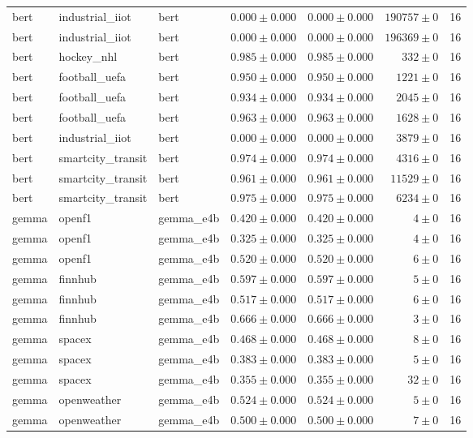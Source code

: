 \begin{table}[htbp]
\begin{tabular}{l l l r r r r}
bert & industrial\_iiot & bert & $0.000\pm0.000$ & $0.000\pm0.000$ & $190757\pm0$ & 16 \\
bert & industrial\_iiot & bert & $0.000\pm0.000$ & $0.000\pm0.000$ & $196369\pm0$ & 16 \\
bert & hockey\_nhl & bert & $0.985\pm0.000$ & $0.985\pm0.000$ & $332\pm0$ & 16 \\
bert & football\_uefa & bert & $0.950\pm0.000$ & $0.950\pm0.000$ & $1221\pm0$ & 16 \\
bert & football\_uefa & bert & $0.934\pm0.000$ & $0.934\pm0.000$ & $2045\pm0$ & 16 \\
bert & football\_uefa & bert & $0.963\pm0.000$ & $0.963\pm0.000$ & $1628\pm0$ & 16 \\
bert & industrial\_iiot & bert & $0.000\pm0.000$ & $0.000\pm0.000$ & $3879\pm0$ & 16 \\
bert & smartcity\_transit & bert & $0.974\pm0.000$ & $0.974\pm0.000$ & $4316\pm0$ & 16 \\
bert & smartcity\_transit & bert & $0.961\pm0.000$ & $0.961\pm0.000$ & $11529\pm0$ & 16 \\
bert & smartcity\_transit & bert & $0.975\pm0.000$ & $0.975\pm0.000$ & $6234\pm0$ & 16 \\
gemma & openf1 & gemma\_e4b & $0.420\pm0.000$ & $0.420\pm0.000$ & $4\pm0$ & 16 \\
gemma & openf1 & gemma\_e4b & $0.325\pm0.000$ & $0.325\pm0.000$ & $4\pm0$ & 16 \\
gemma & openf1 & gemma\_e4b & $0.520\pm0.000$ & $0.520\pm0.000$ & $6\pm0$ & 16 \\
gemma & finnhub & gemma\_e4b & $0.597\pm0.000$ & $0.597\pm0.000$ & $5\pm0$ & 16 \\
gemma & finnhub & gemma\_e4b & $0.517\pm0.000$ & $0.517\pm0.000$ & $6\pm0$ & 16 \\
gemma & finnhub & gemma\_e4b & $0.666\pm0.000$ & $0.666\pm0.000$ & $3\pm0$ & 16 \\
gemma & spacex & gemma\_e4b & $0.468\pm0.000$ & $0.468\pm0.000$ & $8\pm0$ & 16 \\
gemma & spacex & gemma\_e4b & $0.383\pm0.000$ & $0.383\pm0.000$ & $5\pm0$ & 16 \\
gemma & spacex & gemma\_e4b & $0.355\pm0.000$ & $0.355\pm0.000$ & $32\pm0$ & 16 \\
gemma & openweather & gemma\_e4b & $0.524\pm0.000$ & $0.524\pm0.000$ & $5\pm0$ & 16 \\
gemma & openweather & gemma\_e4b & $0.500\pm0.000$ & $0.500\pm0.000$ & $7\pm0$ & 16 \\

\end{tabular}
\end{table}
